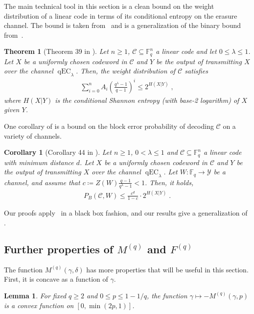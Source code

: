 \documentclass{article}
\DeclareMathOperator{\qEC}{qEC}
\newcommand{\cC}{\mathcal{C}}
\newcommand{\bF}{\mathbb{F}}
\theoremstyle{plain}
\theoremstyle{plain}
\newtheorem{theorem}[definition]{Theorem}%
\theoremstyle{plain}
\theoremstyle{plain}
\theoremstyle{plain}
\theoremstyle{plain}
\theoremstyle{plain}
\newtheorem{lemma}[definition]{Lemma}%
\theoremstyle{plain}
\newtheorem{corollary}[definition]{Corollary}%
\theoremstyle{plain}
\theoremstyle{plain}
\theoremstyle{remark}
\theoremstyle{remark}
\theoremstyle{remark}
\theoremstyle{plain}
\begin{document}
The main technical tool in this section is
a clean bound on the weight distribution of a linear code 
in terms of its conditional entropy on the erasure channel.
The bound is taken from~\cite{abawonse2025generalized} and is a generalization of the binary bound 
from~\cite{hkazla2021codes}.
\begin{theorem}[Theorem 39 in \cite{abawonse2025generalized}]
     \label{prop:weight_distribution_bound}
     Let $n\ge1$, $\cC\subseteq\bF^n_q$ a linear code
     and let $0\le\lambda\le 1$. Let $X$ be a uniformly chosen codeword in $\cC$ and $Y$ be the output of transmitting $X$ over the channel $\qEC_\lambda$. Then, the weight distribution of $\cC$ satisfies
     \begin{align*}
         \sum_{i=0}^nA_i\left(\frac{q^\lambda-1}{q-1}\right)^i\le 2^{H(X|Y)}\;,
     \end{align*}
     where $H(X|Y)$ is the conditional Shannon entropy 
     (with base-2 logarithm) of 
     $X$ given $Y$.
\end{theorem}
One corollary of  is a bound on the block error probability of decoding $\cC$ on a variety of channels.
\begin{corollary}[Corollary 44 in \cite{abawonse2025generalized}]
    \label{cor:block_error_bound_W}
    Let $n\ge1$, $0<\lambda\le 1$ and  $\cC\subseteq\bF^n_q$ a linear code with minimum distance $d$. Let $X$ be a uniformly chosen codeword in $\cC$ and $Y$ be the output of transmitting $X$ over the channel $\qEC_\lambda$. Let $W:\mathbb{F}_q\to\mathcal{Y}$ be a channel, and assume that $c\coloneqq Z(W)\frac{q-1}{q^{\lambda}-1}<1$. Then, it holds,
    \begin{align*}
        P_B(\cC,W)\le\frac{c^d}{1-c}\cdot2^{H(X|Y)}\;.
    \end{align*}
\end{corollary}

Our proofs apply~ in a
black box fashion, and our results give a generalization 
of .

\subsection{Further properties of
$M^{(q)}$ and $F^{(q)}$}

The function $M^{(q)}(\gamma,\delta)$
has more properties that will be useful
in this section. First, it is concave
as a function of $\gamma$.

\begin{lemma}
\label{clm:M_gamma_concavity}
For fixed $q\ge 2$ and $0\le p\le 1-1/q$,
the function $\gamma\mapsto - M^{(q)}(\gamma,p)$ is a convex function on $[0,\min(2p,1)]$.
\end{lemma}
\end{document}
